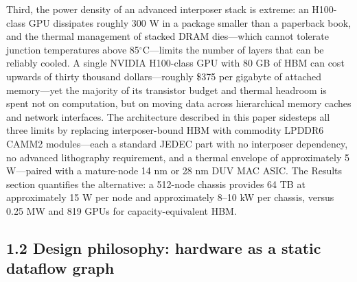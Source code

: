 \documentclass[12pt,onecolumn]{article}
\begin{document}
Third, the power density of an advanced interposer stack is extreme: an H100-class GPU dissipates roughly 300 W in a package smaller than a paperback book, and the thermal management of stacked DRAM dies---which cannot tolerate junction temperatures above 85$^\circ$C---limits the number of layers that can be reliably cooled. A single NVIDIA H100-class GPU with 80 GB of HBM can cost upwards of thirty thousand dollars---roughly \$375 per gigabyte of attached memory---yet the majority of its transistor budget and thermal headroom is spent not on computation, but on moving data across hierarchical memory caches and network interfaces\cite{2}. The architecture described in this paper sidesteps all three limits by replacing interposer-bound HBM with commodity LPDDR6 CAMM2 modules\cite{16,17}---each a standard JEDEC part with no interposer dependency, no advanced lithography requirement, and a thermal envelope of approximately 5 W---paired with a mature-node 14 nm or 28 nm DUV MAC ASIC. The Results section quantifies the alternative: a 512-node chassis provides 64 TB at approximately 15 W per node and approximately 8--10 kW per chassis, versus 0.25 MW and 819 GPUs for capacity-equivalent HBM.

\subsection*{1.2 Design philosophy: hardware as a static dataflow graph}\label{sec:1.2}
\end{document}
